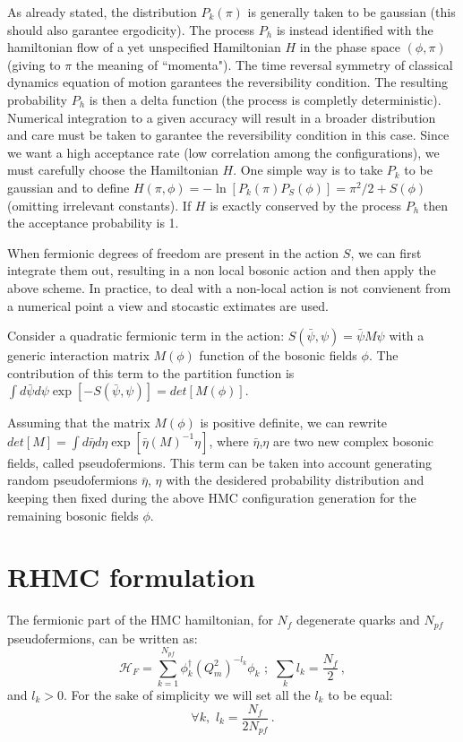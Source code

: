 \documentclass{article}[12pt]
\begin{document}
As already stated, the distribution $P_k(\pi)$ is generally taken to be gaussian (this should also garantee ergodicity).
The process $P_h$ is instead identified with the hamiltonian flow of a yet unspecified Hamiltonian $H$ in the phase
space $(\phi,\pi)$ (giving to $\pi$ the meaning of ``momenta"). The time reversal symmetry of classical dynamics equation of motion
garantees the reversibility condition. The resulting probability $P_h$ is then a delta function (the process is completly deterministic).
Numerical integration to a given accuracy will result in a broader distribution and care must be taken to garantee the reversibility condition 
in this case.
Since we want a high acceptance rate (low correlation among the configurations), we must carefully choose the Hamiltonian $H$.
One simple way is to take $P_k$ to be gaussian and to define $H(\pi,\phi)=-\ln [P_k(\pi) P_S(\phi)] = \pi^2/2 + S(\phi)$ 
(omitting irrelevant constants). If $H$ is exactly conserved by the process $P_h$ then the acceptance probability is 1.

When fermionic degrees of freedom are present in the action $S$, we can first integrate them out, resulting in a non
local bosonic action and then apply the above scheme. In practice, to deal with a non-local action is not convienent
from a numerical point a view and stocastic extimates are used.

Consider a quadratic fermionic term  in the action: $S(\bar\psi,\psi) = \bar\psi M \psi$ with a generic interaction
matrix $M(\phi)$ function of the bosonic fields $\phi$. The contribution of this term to the partition function
is $\int d\bar\psi d\psi \exp [ -S(\bar\psi,\psi)] = det[M(\phi)]$. 

Assuming that the matrix $M(\phi)$ is positive definite,
we can rewrite $det[M]=\int d\bar\eta d\eta \exp[ \bar\eta (M)^{-1} \eta ]$, where $\bar\eta$,$\eta$ are two new 
complex bosonic fields, called pseudofermions.
This term can be taken into account generating random pseudofermions $\bar\eta$, $\eta$ with the desidered probability
distribution and keeping then fixed during the above HMC configuration generation for the remaining bosonic fields $\phi$.



\section{RHMC formulation}

The fermionic part of the HMC hamiltonian, for $N_f$ degenerate 
quarks and $N_{pf}$ pseudofermions, can be written as:
%
\begin{equation}
\mathcal{H}_F = \sum_{k=1}^{N_{pf}} \phi_k^\dagger ( Q_m^2 )^{-l_k} \phi_k \,\, ;\,\, \sum_k l_k = \frac{N_f}{2}\, , \label{HFN}
\end{equation}
and $l_k>0$. For the sake of simplicity we will set all the $l_k$ to be equal:
\begin{equation}
\forall k,\,\, l_k = \frac{N_f}{2N_{pf}}\, .
\end{equation}
\end{document}
